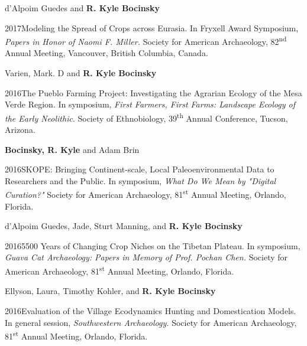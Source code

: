 d'Alpoim Guedes and {\bf R. Kyle Bocinsky}
\nopagebreak
\begin{list1}
\item[] 2017\hspace{.2cm}Modeling the Spread of Crops across Eurasia. In Fryxell Award Symposium, \emph{Papers in Honor of Naomi F. Miller.} Society for American Archaeology, 82\textsuperscript{nd} Annual Meeting, Vancouver, British Columbia, Canada.
\end{list1}

Varien, Mark. D and {\bf R. Kyle Bocinsky}
\nopagebreak
\begin{list1}
\item[] 2016\hspace{.2cm}The Pueblo Farming Project: Investigating the Agrarian Ecology of the Mesa Verde Region. In symposium, \emph{First Farmers, First Farms: Landscape Ecology of the Early Neolithic}. Society of Ethnobiology, 39\textsuperscript{th} Annual Conference, Tucson, Arizona.
\end{list1}

{\bf Bocinsky, R. Kyle} and Adam Brin
\nopagebreak
\begin{list1}
\item[] 2016\hspace{.2cm}SKOPE: Bringing Continent-scale, Local Paleoenvironmental Data to Researchers and the Public. In symposium, \emph{What Do We Mean by "Digital Curation?"} Society for American Archaeology, 81\textsuperscript{st} Annual Meeting, Orlando, Florida.
\end{list1}

d'Alpoim Guedes, Jade, Sturt Manning, and {\bf R. Kyle Bocinsky}
\nopagebreak
\begin{list1}
\item[] 2016\hspace{.2cm}5500 Years of Changing Crop Niches on the Tibetan Plateau. In symposium, \emph{Guava Cat Archaeology: Papers in Memory of Prof. Pochan Chen.} Society for American Archaeology, 81\textsuperscript{st} Annual Meeting, Orlando, Florida.
\end{list1}

\newpage
Ellyson, Laura, Timothy Kohler, and {\bf R. Kyle Bocinsky}
\nopagebreak
\begin{list1}
\item[] 2016\hspace{.2cm}Evaluation of the Village Ecodynamics Hunting and Domestication Models. In general session, \emph{Southwestern Archaeology.} Society for American Archaeology, 81\textsuperscript{st} Annual Meeting, Orlando, Florida.
\end{list1}

